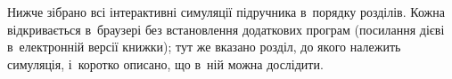 

\clearpage

\simheading\label{sec:Simulations}\hypertarget{Simulations}{}

Нижче зібрано всі інтерактивні симуляції підручника в~порядку розділів. Кожна відкривається в~браузері
без встановлення додаткових програм (посилання дієві в~електронній версії книжки); тут же вказано розділ, до якого належить
симуляція, і~коротко описано, що в~ній можна дослідити.

\simlist
